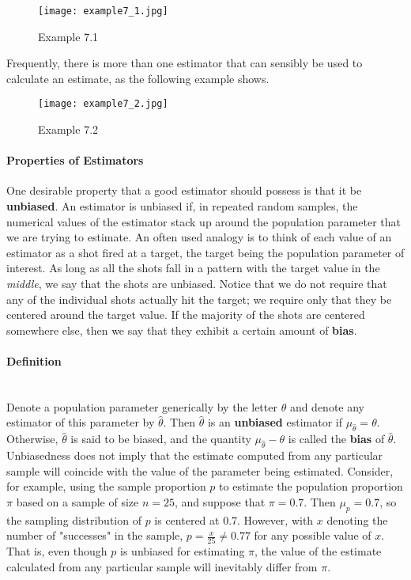 \documentclass{article}
\newcommand{\p}[1]{\paragraph{#1}} %
\begin{document}
	\begin{figure}[!htbp]
	   \centering
	   \texttt{[image: example7\_1.jpg]} 
	   \caption{Example 7.1}
	   \label{fig:example7_1}
	\end{figure}
	
	Frequently, there is more than one estimator that can sensibly be used to calculate an estimate, 
	as the following example shows.
	
	\begin{figure}[!htbp]
	   \centering
	   \texttt{[image: example7\_2.jpg]} 
	   \caption{Example 7.2}
	   \label{fig:example7_2}
	\end{figure}
	
	\p{Properties of Estimators} One desirable property that a good estimator should possess is that 
	it be \textbf{unbiased}. An estimator is unbiased if, in repeated random samples, the numerical 
	values of the estimator stack up around the population parameter that we are trying to estimate. 
	An often used analogy is to think of each value of an estimator as a shot fired at a target, the 
	target being the population parameter of interest. As long as all the shots fall in a pattern with the 
	target value in the \emph{middle}, we say that the shots are unbiased. Notice that we do not 
	require that any of the individual shots actually hit the target; we require only that they be 
	centered around the target value. If the majority of the shots are centered somewhere else, then 
	we say that they exhibit a certain amount of \textbf{bias}.
	
	\p{Definition} ~ \\
	Denote a population parameter generically by the letter $\theta$ and denote any estimator of 
	this parameter by $\hat{\theta}$. Then $\hat{\theta}$ is an \textbf{unbiased} estimator if $
	\mu_{\hat{\theta}} = \theta$. Otherwise, $\hat{\theta}$ is said to be biased, and the quantity $
	\mu_{\hat{\theta}} - \theta$ is called the \textbf{bias} of $\hat{\theta}$. \\
	
	Unbiasedness does not imply that the estimate computed from any particular sample will 
	coincide with the value of the parameter being estimated. Consider, for example, using the 
	sample proportion $p$ to estimate the population proportion $\pi$ based on a sample of size 
	$n=25$, and suppose that $\pi = 0.7$. Then $\mu_p=0.7$, so the sampling distribution of $p$ is 
	centered at 0.7. However, with $x$ denoting the number of "successes" in the sample, $p = 
	\frac{x}{25} \not= 0.77$ for any possible value of $x$. That is, even though $p$ is unbiased for 
	estimating $\pi$, the value of the estimate calculated from any particular sample will inevitably 
	differ from $\pi$. \\
	
\end{document}
